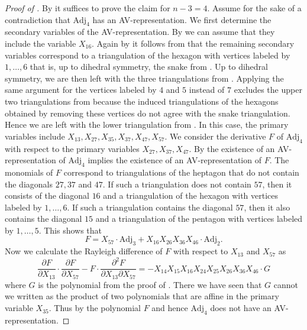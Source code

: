 \documentclass[a4paper,10pt]{amsart}
\theoremstyle{definition}
\theoremstyle{plain}
\begin{document}
\begin{proof}[Proof of ]
    By  it suffices to prove the claim for $n-3=4$. Assume for the sake of a contradiction that $\mathrm{Adj}_4$ has an AV-representation. We first determine the secondary variables of the AV-representation. By  we can assume that they include the variable $X_{16}$. Again by  it follows from  that the remaining secondary variables correspond to a triangulation of the hexagon with vertices labeled by $1,\ldots,6$ that is, up to dihedral symmetry, the snake from . Up to dihedral symmetry, we are then left with the three triangulations from . Applying the same argument for the vertices labeled by $4$ and $5$ instead of $7$ excludes the upper two triangulations from  because the induced triangulations of the hexagons obtained by removing these vertices do not agree with the snake triangulation.
    Hence we are left with the lower triangulation from . In this case, the primary variables include $X_{13},X_{27},X_{35},X_{37},X_{47},X_{57}$.
    We consider the derivative $F$ of $\mathrm{Adj}_4$ with respect to the primary variables $X_{27}, X_{37}, X_{47}$. By  the existence of an AV-representation of $\mathrm{Adj}_4$ implies the existence of an AV-representation of $F$. The monomials of $F$ correspond to triangulations of the heptagon that do not contain the diagonals $27, 37$ and $47$. If such a triangulation does not contain $57$, then it consists of the diagonal $16$ and a triangulation of the hexagon with vertices labeled by $1,\ldots,6$. If such a triangulation contains the diagonal $57$, then it also contains the diagonal $15$ and a triangulation of the pentagon with vertices labeled by $1,\ldots,5$. This shows that
    \begin{equation*}
        F= X_{57} \cdot \mathrm{Adj}_3 + X_{16} X_{26} X_{36} X_{46} \cdot \mathrm{Adj}_2.
    \end{equation*}
    Now we calculate the Rayleigh difference of $F$ with respect to $X_{13}$ and $X_{57}$ as
    \begin{equation*}
        \frac{\partial F}{\partial X_{13}}\cdot \frac{\partial F}{\partial X_{57}}- F\cdot \frac{\partial^2 F}{\partial X_{13}\partial X_{57}}=-X_{14} X_{15} X_{16} X_{24} X_{25} X_{26} X_{36} X_{46}\cdot G
    \end{equation*}
    where $G$ is the polynomial from the proof of . There we have seen that $G$ cannot we written as the product of two polynomials that are affine in the primary variable $X_{35}$. Thus by  the polynomial $F$ and hence $\mathrm{Adj}_4$ does not have an AV-representation.
\end{proof}
\end{document}
